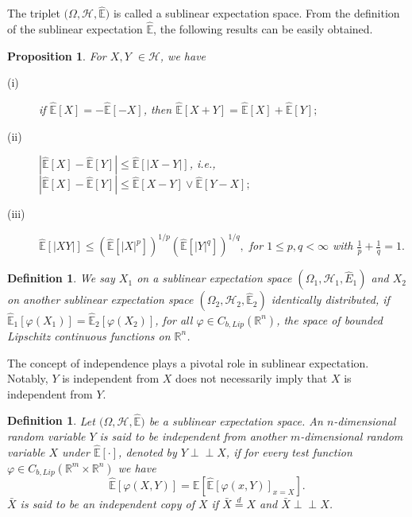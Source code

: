\documentclass[a4paper,oneside,10pt]{article}%
\newtheorem{definition}[theorem]{Definition}
\newtheorem{proposition}[theorem]{Proposition}
\numberwithin{equation}{section}
\begin{document}
The triplet $(\Omega,\mathcal{H},\mathbb{\hat{E})}$ is called a sublinear
expectation space.
From the definition of the sublinear expectation $\mathbb{\hat{E}}$, the
following results can be easily obtained.

\begin{proposition}
\label{Prop^E Plimi}For $X,Y$ $\in \mathcal{H}$, we have

\begin{description}
\item[(i)] if $\mathbb{\hat{E}}[X] =-\mathbb{\hat{E}}[-X]$, then
$\mathbb{\hat{E}}[X+Y] =\mathbb{\hat{E}}[X] +\mathbb{\hat{E}}[Y] ;$

\item[(ii)] $|\mathbb{\hat{E}}[X]-\mathbb{\hat{E}}[Y]|\leq \mathbb{\hat{E}%
}[\vert X-Y\vert]$, i.e., $|\mathbb{\hat{E}}[X] -\mathbb{\hat{E}}[Y]
|\leq \mathbb{\hat{E}}[X-Y] \vee \mathbb{\hat{E}}[Y-X];$

\item[(iii)] $\mathbb{\hat{E}}[\vert XY \vert] \leq(\mathbb{\hat{E}}[\vert
X\vert^{p}])^{1/p} (\mathbb{\hat{E}}[\vert Y\vert^{q}] )^{1/q},$ for $1\leq
p,q<\infty$ with $\frac{1}{p}+\frac{1}{q}=1.$
\end{description}
\end{proposition}

\begin{definition}
We say $X_{1}$ on a sublinear expectation space $(\Omega_{1},\mathcal{H}%
_{1},\hat{E}_{1})$ and $X_{2}$ on another sublinear expectation space
$(\Omega_{2},\mathcal{H}_{2},\mathbb{\hat{E}}_{2})$ identically distributed,
if $\mathbb{\hat{E}}_{1}[\varphi(X_{1})]=\mathbb{\hat{E}} _{2}[\varphi
(X_{2})]$, for all $\varphi \in{C_{b,Lip}}(\mathbb{R}^{n})$, the space of
bounded Lipschitz continuous functions on $\mathbb{R}^{n}$.
\end{definition}

The concept of independence plays a pivotal role in sublinear expectation.
Notably, $Y$ is independent from $X$ does not necessarily imply that $X$ is
independent from $Y$.

\begin{definition}
Let $(\Omega,\mathcal{H},\mathbb{\hat{E})}$ be a sublinear expectation space.
An $n$-dimensional random variable $Y$ is said to be independent from another
$m$-dimensional random variable $X$ under $\mathbb{\hat{E}}[\cdot]$, denoted
by $Y \perp \! \! \! \perp X$, if for every test function $\varphi \in
C_{b,Lip}(\mathbb{R}^{m}\times \mathbb{R}^{n})$ we have
\[
\mathbb{\hat{E}}\left[  \varphi(X,Y)\right]  =\mathbb{\hat{E}}\left[
\mathbb{\hat{E}}\left[  \varphi(x,Y)\right]  _{x=X}\right]  .
\]
$\bar{X}$ is said to be an independent copy of $X$ if $\bar{X}\overset{d}{=}X$
and $\bar{X}\perp \! \! \! \perp X$.
\end{definition}
\end{document}
